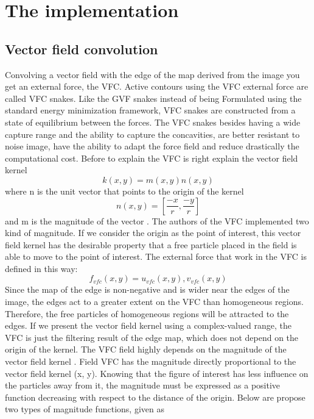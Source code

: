 \chapter{The implementation}
\section{Vector field convolution}
Convolving a vector field with the edge of the map derived from the image you get an external force, the VFC. Active contours using the VFC external force are called VFC snakes. Like the GVF snakes instead of being Formulated using the standard energy minimization framework, VFC snakes are constructed from a state of equilibrium between the forces. The VFC snakes besides having a wide capture range and the ability to capture the concavities, are better resistant to noise image, have the ability to adapt the force field and reduce drastically the computational cost.
Before to explain the VFC is right explain the vector field kernel
\begin{equation}
 k ( x,y ) =m(x,y)n(x,y)
\end{equation}
where n is the unit vector that points to the origin of the kernel	
\begin{equation}
n ( x,y ) = [\frac{-x}{r} , \frac{-y}{r} ]
\end{equation}
and m is the magnitude of the vector . The authors of the VFC implemented two kind of magnitude. If we consider the origin as the point of interest, this vector field kernel has the desirable property that a free particle placed in the field is able to move to the point of interest. The external force that work in the VFC is defined in this way:
\begin{equation}
{f} _{vfc} ( x,y ) = {u} _{vfc} ( x,y ) , {v} _{vfc} (x,y)
\end{equation}
Since the map of the edge is non-negative and is wider near the edges of the image, the edges act to a greater extent on the VFC than homogeneous regions. Therefore, the free particles of homogeneous regions will be attracted to the edges. If we present the vector field kernel using a complex-valued range, the VFC is just the filtering result of the edge map, which does not depend on the origin of the kernel. The VFC field highly depends on the magnitude of the vector field kernel . Field VFC has the magnitude directly proportional to the vector field kernel (x, y). Knowing that the figure of interest has less influence on the particles away from it, the magnitude must be expressed as a positive function decreasing with respect to the distance of the origin. Below are propose two types of magnitude functions, given as
